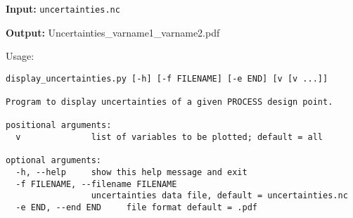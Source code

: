 \documentclass[10pt,a4paper]{article}
\newcommand{\process}{\mbox{\texttt{PROCESS}}}
\begin{document}
\begin{description}
\item{\textbf{Input:}}
 \texttt{uncertainties.nc}
                                
\item{\textbf{Output:}}
Uncertainties\_varname1\_varname2.pdf
\end{description}

Usage:
\begin{verbatim}
display_uncertainties.py [-h] [-f FILENAME] [-e END] [v [v ...]]

Program to display uncertainties of a given PROCESS design point.

positional arguments:
  v              list of variables to be plotted; default = all

optional arguments:
  -h, --help     show this help message and exit
  -f FILENAME, --filename FILENAME
                 uncertainties data file, default = uncertainties.nc
  -e END, --end END     file format default = .pdf
\end{verbatim}






\end{document}
